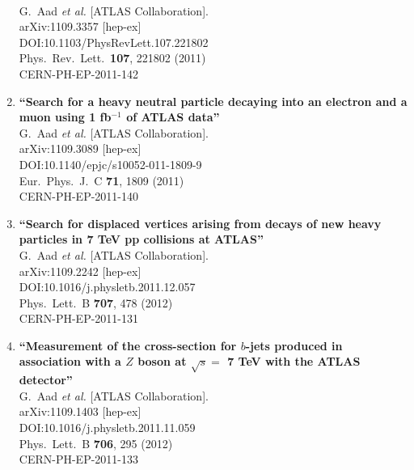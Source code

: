 \documentclass{article}
\begin{document}
\begin{enumerate}
  \\{}G.~Aad {\it et al.} [ATLAS Collaboration].
  \\{}arXiv:1109.3357 [hep-ex]
  \\{}DOI:10.1103/PhysRevLett.107.221802
  \\{}Phys.\ Rev.\ Lett.\  {\bf 107}, 221802 (2011)
  \\{}CERN-PH-EP-2011-142
\item%
{\bf ``Search for a heavy neutral particle decaying into an electron and a muon using 1 fb$^{-1}$ of ATLAS data''}
  \\{}G.~Aad {\it et al.} [ATLAS Collaboration].
  \\{}arXiv:1109.3089 [hep-ex]
  \\{}DOI:10.1140/epjc/s10052-011-1809-9
  \\{}Eur.\ Phys.\ J.\ C {\bf 71}, 1809 (2011)
  \\{}CERN-PH-EP-2011-140
\item%
{\bf ``Search for displaced vertices arising from decays of new heavy particles in 7 TeV pp collisions at ATLAS''}
  \\{}G.~Aad {\it et al.} [ATLAS Collaboration].
  \\{}arXiv:1109.2242 [hep-ex]
  \\{}DOI:10.1016/j.physletb.2011.12.057
  \\{}Phys.\ Lett.\ B {\bf 707}, 478 (2012)
  \\{}CERN-PH-EP-2011-131
\item%
{\bf ``Measurement of the cross-section for $b$-jets produced in association with a $Z$ boson at $\sqrt{s}=$ 7 TeV with the ATLAS detector''}
  \\{}G.~Aad {\it et al.} [ATLAS Collaboration].
  \\{}arXiv:1109.1403 [hep-ex]
  \\{}DOI:10.1016/j.physletb.2011.11.059
  \\{}Phys.\ Lett.\ B {\bf 706}, 295 (2012)
  \\{}CERN-PH-EP-2011-133

\end{enumerate}
\end{document}

